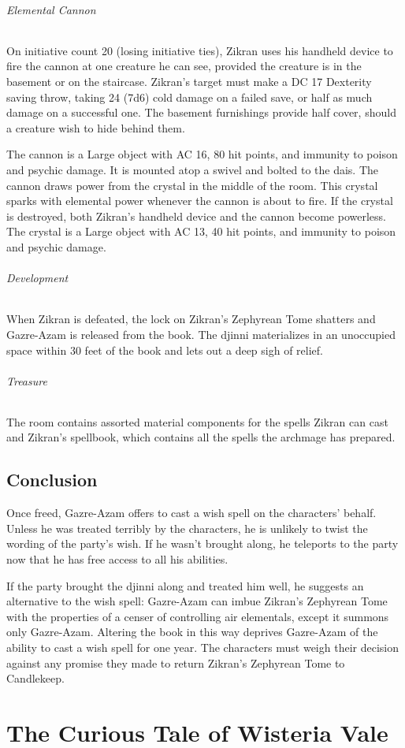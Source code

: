 \documentclass[10pt,a4paper,twoside,bg=print,twocolumn,openany,nodeprecatedcode]{dndbook}
\begin{document}
\subparagraph{Elemental Cannon}
On initiative count 20 (losing initiative ties), Zikran uses his handheld device to fire the cannon at one creature he can see, provided the creature is in the basement or on the staircase. Zikran's target must make a DC 17 Dexterity saving throw, taking 24 (7d6) cold damage on a failed save, or half as much damage on a successful one. The basement furnishings provide half cover, should a creature wish to hide behind them.

The cannon is a Large object with AC 16, 80 hit points, and immunity to poison and psychic damage. It is mounted atop a swivel and bolted to the dais. The cannon draws power from the crystal in the middle of the room. This crystal sparks with elemental power whenever the cannon is about to fire. If the crystal is destroyed, both Zikran's handheld device and the cannon become powerless. The crystal is a Large object with AC 13, 40 hit points, and immunity to poison and psychic damage.

\subparagraph{Development}
When Zikran is defeated, the lock on Zikran's Zephyrean Tome shatters and Gazre-Azam is released from the book. The djinni materializes in an unoccupied space within 30 feet of the book and lets out a deep sigh of relief.

\subparagraph{Treasure}
The room contains assorted material components for the spells Zikran can cast and Zikran's spellbook, which contains all the spells the archmage has prepared.

\section{Conclusion}
Once freed, Gazre-Azam offers to cast a wish spell on the characters' behalf. Unless he was treated terribly by the characters, he is unlikely to twist the wording of the party's wish. If he wasn't brought along, he teleports to the party now that he has free access to all his abilities.

If the party brought the djinni along and treated him well, he suggests an alternative to the wish spell: Gazre-Azam can imbue Zikran's Zephyrean Tome with the properties of a censer of controlling air elementals, except it summons only Gazre-Azam. Altering the book in this way deprives Gazre-Azam of the ability to cast a wish spell for one year. The characters must weigh their decision against any promise they made to return Zikran's Zephyrean Tome to Candlekeep.

\chapter{The Curious Tale of Wisteria Vale}
\end{document}
